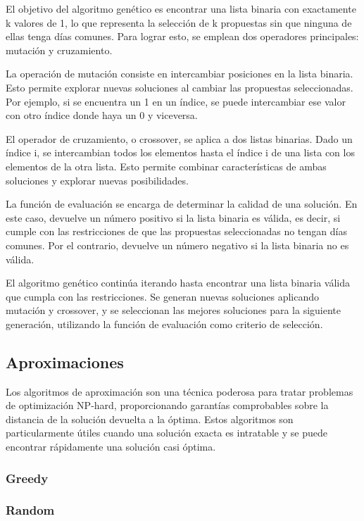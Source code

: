 \documentclass[10pt]{article} %
\begin{document}
	El objetivo del algoritmo genético es encontrar una lista binaria con exactamente k valores de 1, lo que representa la selección de k propuestas sin que ninguna de ellas tenga días comunes. Para lograr esto, se emplean dos operadores principales: mutación y cruzamiento.
	
	La operación de mutación consiste en intercambiar posiciones en la lista binaria. Esto permite explorar nuevas soluciones al cambiar las propuestas seleccionadas. Por ejemplo, si se encuentra un 1 en un índice, se puede intercambiar ese valor con otro índice donde haya un 0 y viceversa.
	
	El operador de cruzamiento, o crossover, se aplica a dos listas binarias. Dado un índice i, se intercambian todos los elementos hasta el índice i de una lista con los elementos de la otra lista. Esto permite combinar características de ambas soluciones y explorar nuevas posibilidades.
	
	La función de evaluación se encarga de determinar la calidad de una solución. En este caso, devuelve un número positivo si la lista binaria es válida, es decir, si cumple con las restricciones de que las propuestas seleccionadas no tengan días comunes. Por el contrario, devuelve un número negativo si la lista binaria no es válida.
	
	El algoritmo genético continúa iterando hasta encontrar una lista binaria válida que cumpla con las restricciones. Se generan nuevas soluciones aplicando mutación y crossover, y se seleccionan las mejores soluciones para la siguiente generación, utilizando la función de evaluación como criterio de selección.
	
	\subsection{Aproximaciones}
	
	Los algoritmos de aproximación son una técnica poderosa para tratar problemas de optimización NP-hard, proporcionando garantías comprobables sobre la distancia de la solución devuelta a la óptima. Estos algoritmos son particularmente útiles cuando una solución exacta es intratable y se puede encontrar rápidamente una solución casi óptima.
	
	\subsubsection{Greedy}
	
	\subsubsection{Random}
	
\end{document}
